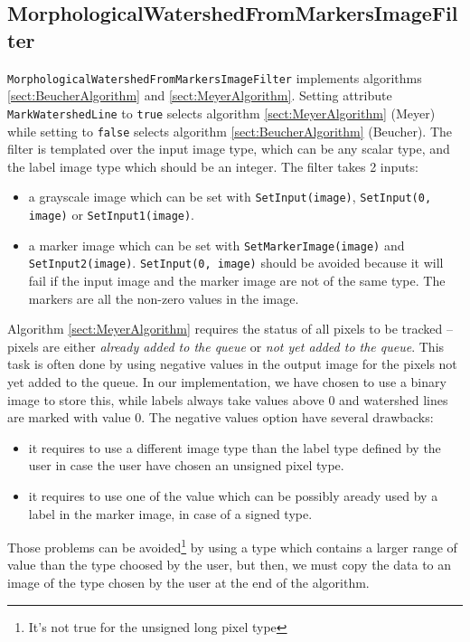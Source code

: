 \documentclass{InsightArticle}
\begin{document}
  \subsection{MorphologicalWatershedFromMarkersImageFilter}

\verb$MorphologicalWatershedFromMarkersImageFilter$ implements
algorithms \ref{sect:BeucherAlgorithm} and \ref{sect:MeyerAlgorithm}.
Setting attribute \verb$MarkWatershedLine$ to \verb$true$ selects
algorithm \ref{sect:MeyerAlgorithm} (Meyer) while setting to
\verb$false$ selects algorithm \ref{sect:BeucherAlgorithm} (Beucher).
The filter is templated over the input image type, which can be any
scalar type, and the label image type which should be an integer. The
filter takes 2 inputs:
\begin{itemize}
  \item a grayscale image which can be set with \verb$SetInput(image)$,
\verb$SetInput(0, image)$ or \verb$SetInput1(image)$.
  \item a marker image which can be set with \verb$SetMarkerImage(image)$
and \verb$SetInput2(image)$. \verb$SetInput(0, image)$ should be avoided
because it will fail if the input image and the marker image are not of the
same type. The markers are all the non-zero values in the image.
\end{itemize}

Algorithm \ref{sect:MeyerAlgorithm} requires the status of all pixels
to be tracked -- pixels are either {\em already added to the queue} or
{\em not yet added to the queue}.  This task is often done by using
negative values in the output image for the pixels not yet added to
the queue. In our implementation, we have chosen to use a binary image
to store this, while labels always take values above 0 and watershed
lines are marked with value 0. The negative values option have several
drawbacks:
\begin{itemize}
  \item it requires to use a different image type than the label type defined
by the user in case the user have chosen an unsigned pixel type.
  \item it requires to use one of the value which can be possibly aready used
by a label in the marker image, in case of a signed type.
\end{itemize}
Those problems can be avoided\footnote{It's not true for the unsigned long
pixel type} by using a type which contains a larger range of value than the
type choosed by the user, but then, we must copy the data to an image of
the type chosen by the user at the end of the algorithm.
\end{document}
